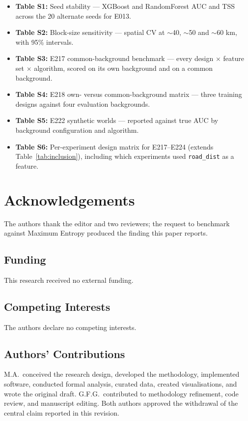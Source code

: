 \documentclass[12pt]{article}
\begin{document}
\begin{itemize}
  \item \textbf{Table S1:} Seed stability --- XGBoost and RandomForest AUC and TSS across the 20 alternate seeds for E013.
  \item \textbf{Table S2:} Block-size sensitivity --- spatial CV at $\sim$40, $\sim$50 and $\sim$60 km, with 95\% intervals.
  \item \textbf{Table S3:} E217 common-background benchmark --- every design $\times$ feature set $\times$ algorithm, scored on its own background and on a common background.
  \item \textbf{Table S4:} E218 own- versus common-background matrix --- three training designs against four evaluation backgrounds.
  \item \textbf{Table S5:} E222 synthetic worlds --- reported against true AUC by background configuration and algorithm.
  \item \textbf{Table S6:} Per-experiment design matrix for E217--E224 (extends Table~\ref{tab:inclusion}), including which experiments used \texttt{road\_dist} as a feature.
\end{itemize}

\section*{Acknowledgements}

The authors thank the editor and two reviewers; the request to benchmark against Maximum Entropy produced the finding this paper reports.

\subsection*{Funding}
This research received no external funding.

\subsection*{Competing Interests}
The authors declare no competing interests.

\subsection*{Authors' Contributions}
M.A.\ conceived the research design, developed the methodology, implemented software, conducted formal analysis, curated data, created visualisations, and wrote the original draft.
G.F.G.\ contributed to methodology refinement, code review, and manuscript editing.
Both authors approved the withdrawal of the central claim reported in this revision.
\end{document}

